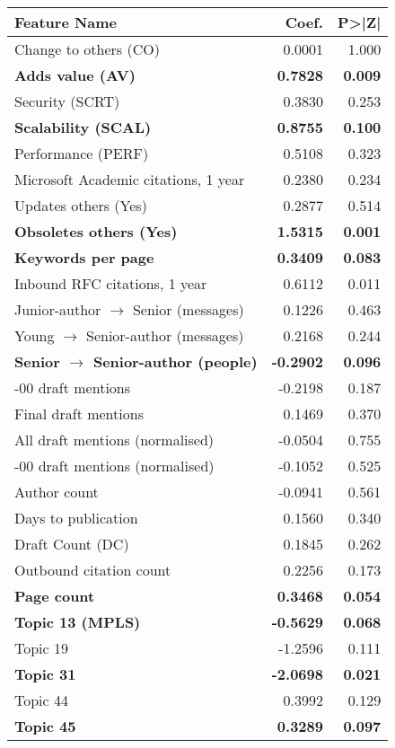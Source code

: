 \begin{table}[t!]
\centering
\begin{tabular}{lrr}
\toprule
Feature Name & Coef. & P>|Z| \\
\midrule
Change to others (CO) & 0.0001 & 1.000 \\
\textbf{Adds value (AV)} & \textbf{0.7828} & \textbf{0.009} \\
Security (SCRT) & 0.3830 & 0.253 \\
\textbf{Scalability (SCAL)} & \textbf{0.8755} & \textbf{0.100} \\
Performance (PERF) & 0.5108 & 0.323 \\
Microsoft Academic citations, 1 year & 0.2380 & 0.234 \\
Updates others (Yes) & 0.2877 & 0.514 \\
\textbf{Obsoletes others (Yes)} & \textbf{1.5315} & \textbf{0.001} \\
\textbf{Keywords per page} & \textbf{0.3409} & \textbf{0.083} \\
Inbound RFC citations, 1 year & 0.6112 & 0.011 \\
Junior-author $\rightarrow$ Senior (messages) & 0.1226 & 0.463 \\
Young $\rightarrow$ Senior-author (messages) & 0.2168 & 0.244 \\
\textbf{Senior $\rightarrow$ Senior-author (people)} & \textbf{-0.2902} & \textbf{0.096} \\
-00 draft mentions & -0.2198 & 0.187 \\
Final draft mentions & 0.1469 & 0.370 \\
All draft mentions (normalised) & -0.0504 & 0.755 \\
-00 draft mentions (normalised) & -0.1052 & 0.525 \\
Author count & -0.0941 & 0.561 \\
Days to publication & 0.1560 & 0.340 \\
Draft Count (DC) & 0.1845 & 0.262 \\
Outbound citation count & 0.2256 & 0.173 \\
\textbf{Page count} & \textbf{0.3468} & \textbf{0.054} \\
\textbf{Topic 13 (MPLS)} & \textbf{-0.5629} & \textbf{0.068} \\
Topic 19 & -1.2596 & 0.111 \\
\textbf{Topic 31} & \textbf{-2.0698} &\textbf{ 0.021} \\
Topic 44 & 0.3992 & 0.129 \\
\textbf{Topic 45} & \textbf{0.3289} & \textbf{0.097} \\

\end{tabular}
\end{table}
